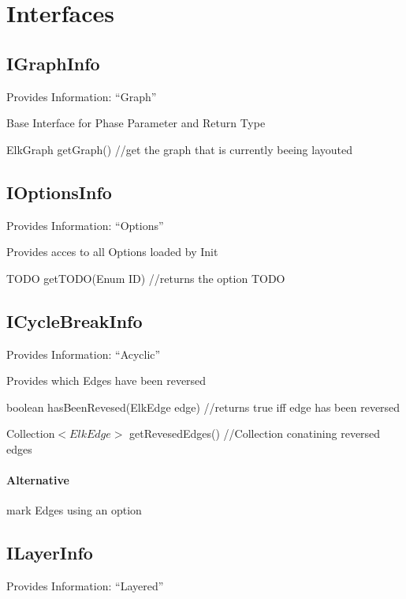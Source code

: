\section{Interfaces}

\subsection{IGraphInfo}
Provides Information: "`Graph"'

Base Interface for Phase Parameter and Return Type

\begin{list}{}{Functions:}
\item ElkGraph getGraph() //get the graph that is currently beeing layouted
\end{list}

\subsection{IOptionsInfo}
Provides Information: "`Options"'

Provides acces to all Options loaded by Init

\begin{list}{}{Functions:}
\item TODO getTODO(Enum ID) //returns the option TODO %
\end{list}

\subsection{ICycleBreakInfo}
Provides Information: "`Acyclic"'

Provides which Edges have been reversed

\begin{list}{}{Functions:}
\item boolean hasBeenRevesed(ElkEdge edge) //returns true iff edge has been reversed
\item Collection$<ElkEdge>$ getRevesedEdges() //Collection conatining reversed edges
\end{list}

\paragraph{Alternative}
	mark Edges using an option
	
\subsection{ILayerInfo}
Provides Information: "`Layered"'

